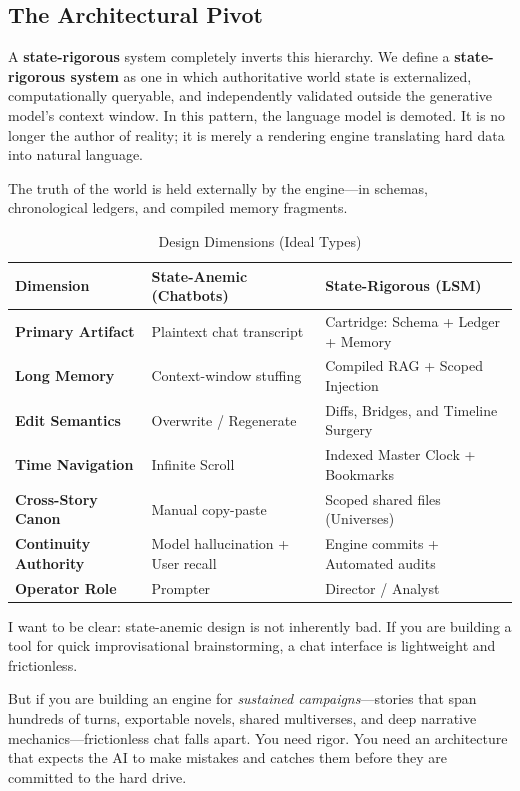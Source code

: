 \documentclass[12pt, a4paper]{article}
\begin{document}
\newpage
\subsection{The Architectural Pivot}

A \textbf{state-rigorous} system completely inverts this hierarchy. We define a \textbf{state-rigorous system} as one in which authoritative world state is externalized, computationally queryable, and independently validated outside the generative model's context window. In this pattern, the language model is demoted. It is no longer the author of reality; it is merely a rendering engine translating hard data into natural language.

The truth of the world is held externally by the engine---in schemas, chronological ledgers, and compiled memory fragments. 

\begin{table}[h]
\centering
\caption{Design Dimensions (Ideal Types)}
\label{tab:contrast}
\small
\begin{tabular}{@{}p{}p{}p{}@{}}
\toprule
\textbf{Dimension} & \textbf{State-Anemic (Chatbots)} & \textbf{State-Rigorous (LSM)} \\
\midrule
\textbf{Primary Artifact} & Plaintext chat transcript & Cartridge: Schema + Ledger + Memory \\
\textbf{Long Memory} & Context-window stuffing & Compiled RAG + Scoped Injection \\
\textbf{Edit Semantics} & Overwrite / Regenerate & Diffs, Bridges, and Timeline Surgery \\
\textbf{Time Navigation} & Infinite Scroll & Indexed Master Clock + Bookmarks \\
\textbf{Cross-Story Canon} & Manual copy-paste & Scoped shared files (Universes) \\
\textbf{Continuity Authority} & Model hallucination + User recall & Engine commits + Automated audits \\
\textbf{Operator Role} & Prompter & Director / Analyst \\
\bottomrule
\end{tabular}
\end{table}

I want to be clear: state-anemic design is not inherently bad. If you are building a tool for quick improvisational brainstorming, a chat interface is lightweight and frictionless. 

But if you are building an engine for \textit{sustained campaigns}---stories that span hundreds of turns, exportable novels, shared multiverses, and deep narrative mechanics---frictionless chat falls apart. You need rigor. You need an architecture that expects the AI to make mistakes and catches them before they are committed to the hard drive.
\end{document}
